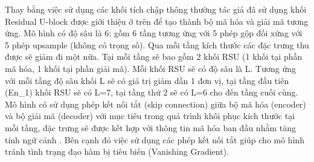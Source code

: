 Thay bằng việc sử dụng các khối tích chập thông thường tác giả đã sử dụng khối Residual U-block được giới thiệu ở trên để tạo thành bộ mã hóa và giải mã tương ứng. Mô hình có độ sâu là 6: gồm 6 tầng tương ứng với 5 phép gộp đối xứng với 5 phép upsample (không có trọng số). Qua mỗi tầng kích thước các đặc trưng thu được sẽ giảm đi một nữa. Tại mỗi tầng sẽ bao gồm 2 khối RSU (1 khối tại phần mã hóa, 1 khối tại phần giải mã). Mỗi khối RSU sẽ có độ sâu là L. Tương ứng với mỗi tầng độ sâu khối L sẽ có giá trị giảm dần 1 đơn vị, tại tầng đầu tiên (En\_1) khối RSU sẽ có L=7, tại tầng thứ 2 sẽ có L=6 cho đến tầng cuối cùng. Mô hình có sử dụng phép kết nối tắt (skip connection) giữa bộ mã hóa (encoder) và bộ giải mã (decoder) với mục tiêu trong quá trình khôi phục kích thước tại mỗi tầng, đặc trưng sẽ được kết hợp với thông tin mã hóa ban đầu nhằm tăng tính ngữ cảnh . Bên cạnh đó việc sử dụng các phép kết nối tắt giúp cho mô hình tránh tình trạng đạo hàm bị tiêu biến (Vanishing Gradient).
